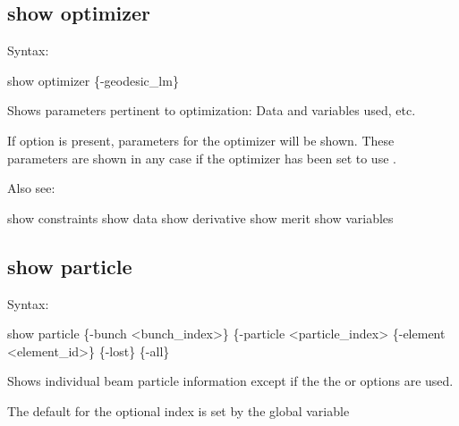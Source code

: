 {{{{{{{{%

\subsection{show optimizer}
\label{s:show.optimizer}

Syntax:
\begin{example}
  show optimizer \{-geodesic_lm\}
\end{example}


Shows parameters pertinent to optimization: Data and variables used,
etc. 

If  option is present, parameters for the  optimizer will
be shown. These parameters are shown in any case if the optimizer has been set to use
.

Also see:
\begin{example}
  show constraints
  show data
  show derivative
  show merit
  show variables
\end{example}


\subsection{show particle}
\label{s:show.particle}

Syntax:
\begin{example}
    show particle \{-bunch <bunch_index>\} \{-particle <particle_index>
                  \{-element <element_id>\} \{-lost\} \{-all\}
\end{example}


Shows individual beam particle information except if the the  or  options are used. 

The default for the optional  index is set by the global variable \vn{global%
The default \vn{-element} is \vn{init} which is the initial beam distribution.
The default \vn{-particle} to show is the particle with index 1.

The \vn{-lost} option shows which particles are lost during beam tracking. Note: Using the
\vn{-lost} option results in one line printed for each lost particle. It is thus meant for use with
bunches with a small number of particles.

The \vn{-all} option shows all particles at the given element.

}}}}}}}}}
